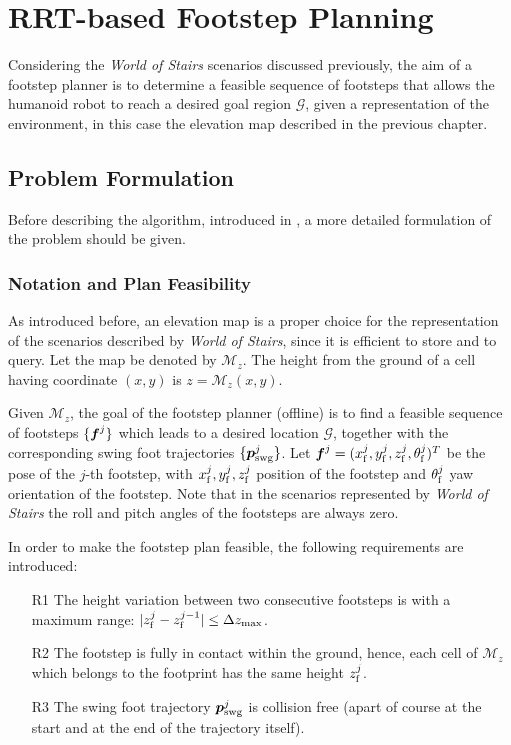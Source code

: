 \chapter{RRT-based Footstep Planning}
\label{ch:rrt-based-footstep-planning}

Considering the \textit{World of Stairs} scenarios discussed previously, the 
aim of a footstep planner is to determine a feasible sequence of footsteps that 
allows the humanoid robot to reach a desired goal region $\mathcal{G}$, given 
a representation of the environment, in this case the elevation map described in 
the previous chapter.

\section{Problem Formulation}
Before describing the algorithm, introduced in \cite{ECC19}, a more detailed 
formulation of the problem should be given.

\subsection{Notation and Plan Feasibility}
As introduced before, an 
elevation map is a proper choice for the representation of the scenarios 
described by \textit{World of Stairs}, since it is efficient to store and to 
query. Let the map be denoted by $\mathcal{M}_z$. The height from the ground of
a cell having coordinate $(x, y)$ is $z = \mathcal{M}_z(x, y)$.

Given $\mathcal{M}_z$, the goal of the footstep planner (offline) is to find 
a feasible sequence of footsteps $\{{\mbox{\boldmath $f$}}^j\}$ which leads to a desired location 
$\mathcal{G}$, together with the corresponding swing foot trajectories
$\{{\mbox{\boldmath $p$}}_{\rm {swg}}^j\}$. Let ${\mbox{\boldmath $f$}}^j = (x_{\rm f}^j, y_{\rm f}^j,
z_{\rm f}^j, \theta_{\rm f}^j)^T$ be the pose of the $j$-th footstep, 
with $x_{\rm f}^j, y_{\rm f}^j, z_{\rm f}^j$ position of the footstep and 
$\theta_{\rm f}^j$ yaw orientation of the footstep. Note that in the scenarios 
represented by \textit{World of Stairs} the roll and pitch angles of the 
footsteps are always zero.

In order to make the footstep plan feasible, the following 
requirements are introduced:
\begin{itemize}
  \item[R1] The height variation between two consecutive footsteps is with 
      a maximum range: $|z_{\rm f}^j - z_{\rm f}^{j-1}| \le \Delta z_{\max}$.
  \item[R2] The footstep is fully in contact within the ground, hence,
      each cell of $\mathcal{M}_z$ which belongs to the footprint has the 
      same height $z_{\rm f}^j$.
  \item[R3] The swing foot trajectory ${\mbox{\boldmath $p$}}_{\rm {swg}}^j$ is collision free
      (apart of course at the start and at the end of the trajectory itself).
\end{itemize}

